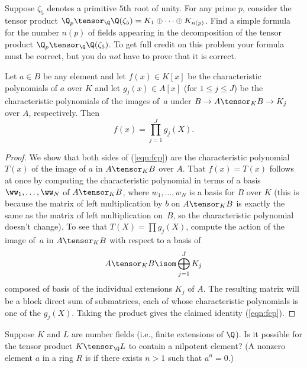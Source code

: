 \documentclass[11pt]{book}
\begin{document}
\begin{ch}
\begin{exercise}\label{ex:normed5}
  Suppose $\zeta_5$ denotes a primitive $5$th root of unity.  For
  any prime $p$, consider the tensor product $\Q_p \tensor_\Q
  \Q(\zeta_5) = K_1\oplus \cdots \oplus K_{n(p)}$.  Find a simple
  formula for the number $n(p)$ of fields appearing in the
  decomposition of the tensor product $\Q_p \tensor_\Q \Q(\zeta_5)$.
  To get full credit on this problem your formula must be correct, but
  you do {\em not} have to prove that it is correct.
\end{exercise}



\begin{corollary}\label{cor:fcp}
  Let $a\in B$ be any element and let $f(x)\in K[x]$ be the
  characteristic polynomials of $a$ over $K$ and let $g_j(x)\in A[x]$
  (for $1\leq j \leq J$) be the characteristic polynomials of the
  images of~$a$ under $B\to A\tensor_K B \to K_j$ over $A$,
  respectively.  Then
\begin{equation}\label{eqn:fcp}
  f(x) = \prod_{j=1}^J g_j(X).
\end{equation}
\end{corollary}
\begin{proof}
  We show that both sides of (\ref{eqn:fcp}) are the characteristic
  polynomial $T(x)$ of the image of $a$ in $A\tensor_K B$ over $A$.
  That $f(x)=T(x)$ follows at once by computing the characteristic
  polynomial in terms of a basis $\ww_1,\ldots, \ww_N$ of $A\tensor_K
  B$, where $w_1,\ldots, w_N$ is a basis for $B$ over $K$ (this is
  because the matrix of left multiplication by $b$ on $A \tensor_K B$
  is exactly the same as the matrix of left multiplication on~$B$, so
  the characteristic polynomial doesn't change).  To see that $T(X) =
  \prod g_j(X)$, compute the action of the image of~$a$ in $A\tensor_K
  B$ with respect to a basis of
\begin{equation}\label{eqn:decomp}
  A\tensor_K B \isom \bigoplus_{j=1}^J K_j
\end{equation}
composed of basis of the individual extensions $K_j$ of $A$.  The
  resulting matrix will be a block direct sum of submatrices, each of
  whose characteristic polynomials is one of the $g_j(X)$.  Taking
  the product gives the claimed identity (\ref{eqn:fcp}).
\end{proof}

\begin{exercise}\label{ex:normed6}
Suppose $K$ and $L$ are number fields (i.e., finite
extensions of $\Q$).  Is it possible for the tensor
product $K\tensor_\Q L$ to contain a nilpotent element?
(A nonzero element $a$ in a ring $R$ is  if
there exists $n>1$ such that $a^n=0$.)
\end{exercise}


\end{ch}
\end{document}
